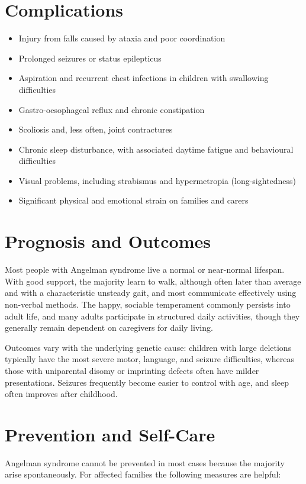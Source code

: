 \section*{Complications}
\begin{itemize}
    \item Injury from falls caused by ataxia and poor coordination
    \item Prolonged seizures or status epilepticus
    \item Aspiration and recurrent chest infections in children with swallowing difficulties
    \item Gastro-oesophageal reflux and chronic constipation
    \item Scoliosis and, less often, joint contractures
    \item Chronic sleep disturbance, with associated daytime fatigue and behavioural difficulties
    \item Visual problems, including strabismus and hypermetropia (long-sightedness)
    \item Significant physical and emotional strain on families and carers
\end{itemize}

\section*{Prognosis and Outcomes}
Most people with Angelman syndrome live a normal or near-normal lifespan. With good support, the majority learn to walk, although often later than average and with a characteristic unsteady gait, and most communicate effectively using non-verbal methods. The happy, sociable temperament commonly persists into adult life, and many adults participate in structured daily activities, though they generally remain dependent on caregivers for daily living.

Outcomes vary with the underlying genetic cause: children with large deletions typically have the most severe motor, language, and seizure difficulties, whereas those with uniparental disomy or imprinting defects often have milder presentations. Seizures frequently become easier to control with age, and sleep often improves after childhood.

\section*{Prevention and Self-Care}
Angelman syndrome cannot be prevented in most cases because the majority arise spontaneously. For affected families the following measures are helpful:

